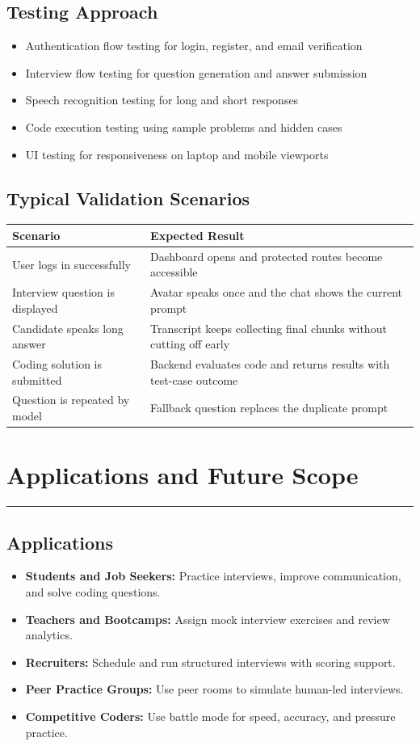 ﻿\documentclass[12pt,a4paper]{article}
\newcommand{\sectionline}{\vspace{0.4em}\hrule\vspace{0.8em}}
\begin{document}
\subsection{Testing Approach}
\begin{itemize}
  \item Authentication flow testing for login, register, and email verification
  \item Interview flow testing for question generation and answer submission
  \item Speech recognition testing for long and short responses
  \item Code execution testing using sample problems and hidden cases
  \item UI testing for responsiveness on laptop and mobile viewports
\end{itemize}

\subsection{Typical Validation Scenarios}
\begin{longtable}{p{5cm}p{9cm}}
\toprule
\rowcolor{SoftGreen}
\textbf{Scenario} & \textbf{Expected Result} \\
\midrule
User logs in successfully & Dashboard opens and protected routes become accessible \\
Interview question is displayed & Avatar speaks once and the chat shows the current prompt \\
Candidate speaks long answer & Transcript keeps collecting final chunks without cutting off early \\
Coding solution is submitted & Backend evaluates code and returns results with test-case outcome \\
Question is repeated by model & Fallback question replaces the duplicate prompt \\
\bottomrule
\end{longtable}

\clearpage

\section{Applications and Future Scope}
\sectionline
\subsection{Applications}
\begin{itemize}
  \item \textbf{Students and Job Seekers:} Practice interviews, improve communication, and solve coding questions.
  \item \textbf{Teachers and Bootcamps:} Assign mock interview exercises and review analytics.
  \item \textbf{Recruiters:} Schedule and run structured interviews with scoring support.
  \item \textbf{Peer Practice Groups:} Use peer rooms to simulate human-led interviews.
  \item \textbf{Competitive Coders:} Use battle mode for speed, accuracy, and pressure practice.
\end{itemize}
\end{document}
